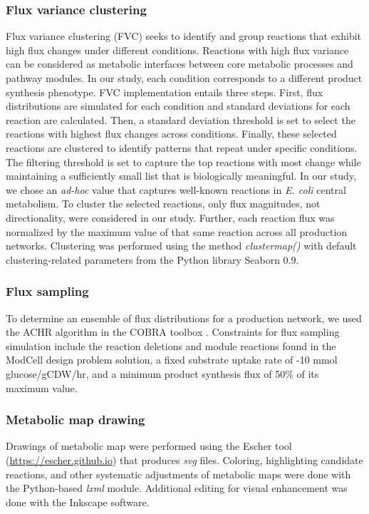 \subsubsection{Flux variance clustering}

Flux variance clustering (FVC) seeks to identify and group reactions that exhibit high flux changes under different conditions. Reactions with high flux variance can be considered as metabolic interfaces between core metabolic processes and pathway modules. In our study, each condition corresponds to a different product synthesis phenotype.  FVC implementation entails three steps. First, flux distributions are simulated for each condition and standard deviations for each reaction are calculated. Then, a standard deviation threshold is set to select the reactions with highest flux changes across conditions. Finally, these selected reactions are clustered to identify patterns that repeat under specific conditions. The filtering threshold is set to capture the top reactions with most change while maintaining a sufficiently small list that is biologically meaningful. In our study, we chose an \emph{ad-hoc} value that captures well-known reactions in \textit{E. coli} central metabolism. To cluster the selected reactions, only flux magnitudes, not directionality, were considered in our study. Further, each reaction flux was normalized by the maximum value of that same reaction across all production networks. Clustering was performed using the method \emph{clustermap()} with default clustering-related parameters from the Python library Seaborn 0.9.


\subsubsection{Flux sampling} \label{sec:sampling}
To determine an ensemble of flux distributions for a production network, we used the ACHR algorithm \citep{kaufman1998} in the COBRA toolbox \citep{heirendt2017}. Constraints for flux sampling simulation include the reaction deletions and module reactions found in the ModCell design problem solution, a fixed substrate uptake rate of -10 mmol glucose/gCDW/hr, and a minimum product synthesis flux of 50\% of its maximum value.

\subsubsection{Metabolic map drawing}
Drawings of metabolic map were performed using the Escher \citep{king2015a} tool (\url{https://escher.github.io}) that produces \textit{svg} files. Coloring, highlighting candidate reactions, and other systematic adjustments of metabolic maps were done with the Python-based \textit{lxml} module. Additional editing for visual enhancement was done with the Inkscape software.




